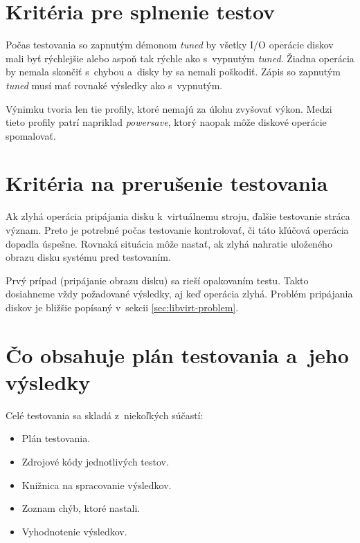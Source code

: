 \section{Kritéria pre splnenie testov}

Počas testovania so zapnutým démonom \emph{tuned} by všetky I/O operácie diskov
mali byť rýchlejšie alebo aspoň tak rýchle ako s~vypnutým \emph{tuned}. Žiadna
operácia by nemala skončiť s~chybou a~disky by sa nemali poškodiť. Zápis so
zapnutým \emph{tuned} musí mať rovnaké výsledky ako s~vypnutým.

Výnimku tvoria len tie profily, ktoré nemajú za úlohu zvyšovať výkon. Medzi
tieto profily patrí napriklad \emph{powersave}, ktorý naopak môže diskové
operácie spomalovať.

\section{Kritéria na prerušenie testovania}

Ak zlyhá operácia pripájania disku k~virtuálnemu stroju, ďalšie testovanie
stráca význam. Preto je potrebné počas testovanie kontrolovať, či táto kľúčová
operácia dopadla úspešne. Rovnaká situácia môže nastať, ak zlyhá nahratie
uloženého obrazu disku systému pred testovaním.

Prvý prípad (pripájanie obrazu disku) sa rieší opakovaním testu. Takto
dosiahneme vždy požadované výsledky, aj keď operácia zlyhá. Problém pripájania
diskov je bližšie popísaný v~sekcii \ref{sec:libvirt-problem}.

\section{Čo obsahuje plán testovania a~jeho výsledky}

Celé testovania sa skladá z~niekoľkých súčastí:

\begin{itemize}
    \item Plán testovania.
    \item Zdrojové kódy jednotlivých testov.
    \item Knižnica na spracovanie výsledkov.
    \item Zoznam chýb, ktoré nastali.
    \item Vyhodnotenie výsledkov.
\end{itemize}

